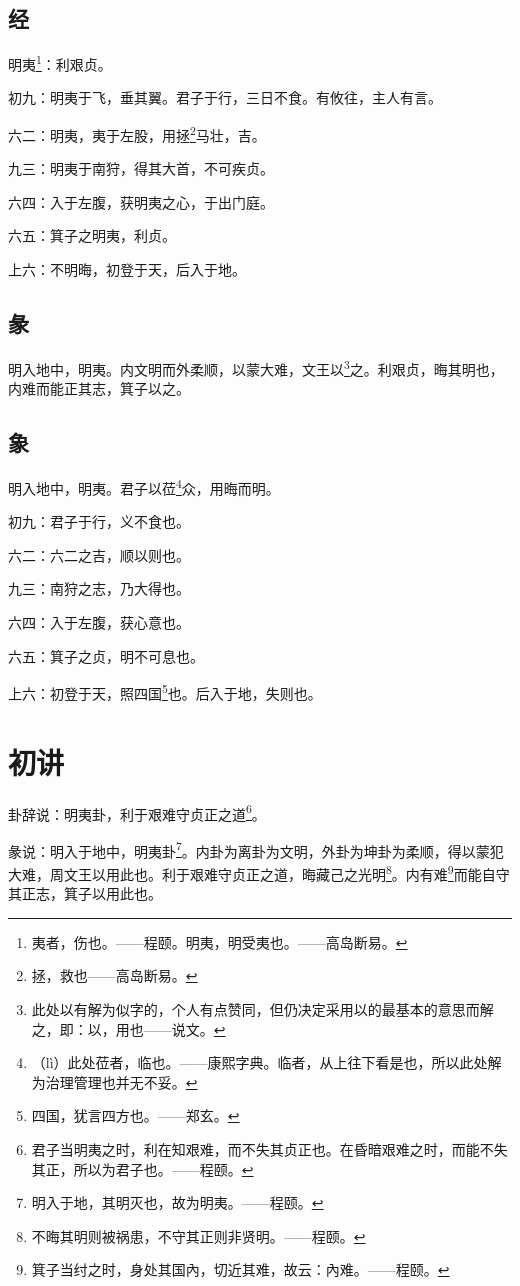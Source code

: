 \documentclass[12pt,oneside]{book}
\begin{document}
\subsection{经}
明夷\footnote{夷者，伤也。——程颐。明夷，明受夷也。——高岛断易。}：利艰贞。

初九：明夷于飞，垂其翼。君子于行，三日不食。有攸往，主人有言。

六二：明夷，夷于左股，用拯\footnote{拯，救也——高岛断易。}马壮，吉。

九三：明夷于南狩，得其大首，不可疾贞。

六四：入于左腹，获明夷之心，于出门庭。

六五：箕子之明夷，利贞。

上六：不明晦，初登于天，后入于地。

\subsection{彖}
明入地中，明夷。内文明而外柔顺，以蒙大难，文王以\footnote{此处以有解为似字的，个人有点赞同，但仍决定采用以的最基本的意思而解之，即：以，用也——说文。}之。利艰贞，晦其明也，内难而能正其志，箕子以之。

\subsection{象}
明入地中，明夷。君子以莅\footnote{（lì）此处莅者，临也。——康熙字典。临者，从上往下看是也，所以此处解为治理管理也并无不妥。}众，用晦而明。

初九：君子于行，义不食也。

六二：六二之吉，顺以则也。

九三：南狩之志，乃大得也。

六四：入于左腹，获心意也。

六五：箕子之贞，明不可息也。

上六：初登于天，照四国\footnote{四国，犹言四方也。——郑玄。}也。后入于地，失则也。

\section{初讲}
卦辞说：明夷卦，利于艰难守贞正之道\footnote{君子当明夷之时，利在知艰难，而不失其贞正也。在昏暗艰难之时，而能不失其正，所以为君子也。——程颐。}。

彖说：明入于地中，明夷卦\footnote{明入于地，其明灭也，故为明夷。——程颐。}。内卦为离卦为文明，外卦为坤卦为柔顺，得以蒙犯大难，周文王以用此也。利于艰难守贞正之道，晦藏己之光明\footnote{不晦其明则被祸患，不守其正则非贤明。——程颐。}。内有难\footnote{箕子当纣之时，身处其国內，切近其难，故云：內难。——程颐。}而能自守其正志，箕子以用此也。
\end{document}
